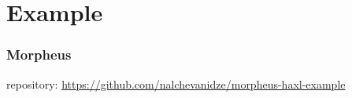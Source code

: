 \section{Example}

\begin{frame}\frametitle{Morpheus}

repository: \url{https://github.com/nalchevanidze/morpheus-haxl-example}

\end{frame}